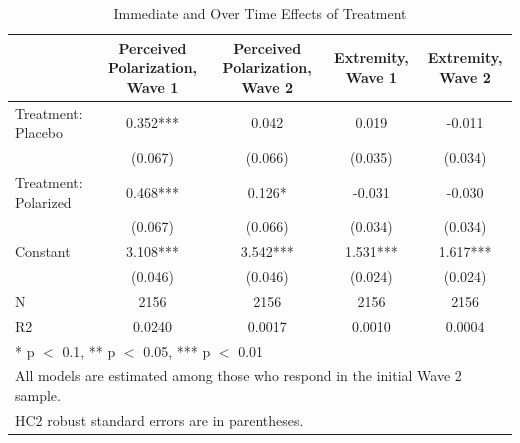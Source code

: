 \begin{table}
\centering
\caption{Immediate and Over Time Effects of Treatment}
\centering
\begin{tabular}[t]{lcccc}
\toprule
  & Perceived Polarization, Wave 1 & Perceived Polarization, Wave 2 & Extremity, Wave 1 & Extremity, Wave 2\\
\midrule
Treatment: Placebo & 0.352*** & 0.042 & 0.019 & -0.011\\
 & (0.067) & (0.066) & (0.035) & (0.034)\\
Treatment: Polarized & 0.468*** & 0.126* & -0.031 & -0.030\\
 & (0.067) & (0.066) & (0.034) & (0.034)\\
Constant & 3.108*** & 3.542*** & 1.531*** & 1.617***\\
 & (0.046) & (0.046) & (0.024) & (0.024)\\
\midrule
N & 2156 & 2156 & 2156 & 2156\\
R2 & 0.0240 & 0.0017 & 0.0010 & 0.0004\\
\bottomrule
\multicolumn{5}{l}{\rule{0pt}{1em}* p $<$ 0.1, ** p $<$ 0.05, *** p $<$ 0.01}\\
\multicolumn{5}{l}{\rule{0pt}{1em}All models are estimated among those who respond in the initial Wave 2 sample.}\\
\multicolumn{5}{l}{\rule{0pt}{1em}HC2 robust standard errors are in parentheses.}\\
\end{tabular}
\end{table}
